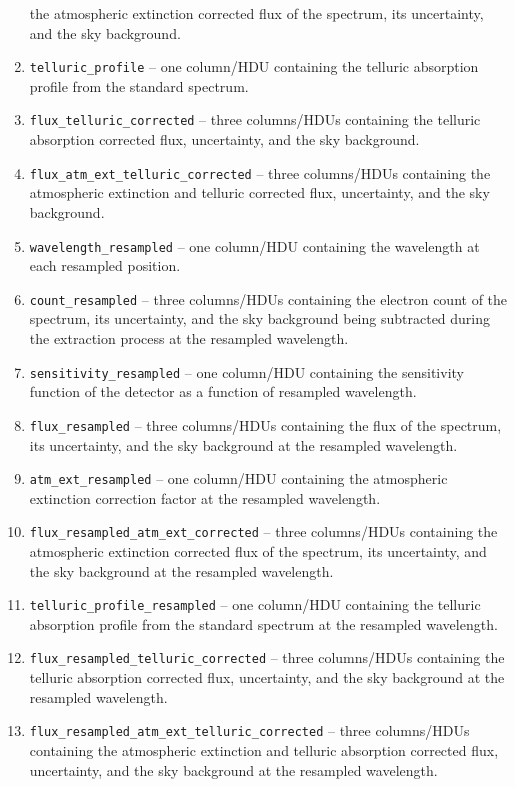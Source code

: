 \documentclass[linenumbers, twocolumn]{aastex631}
\begin{document}
\begin{enumerate}
    the atmospheric extinction corrected flux of the spectrum, its
    uncertainty, and the sky background.
    \item \texttt{telluric\_profile} -- one column/HDU containing the telluric
    absorption profile from the standard spectrum.
    \item \texttt{flux\_telluric\_corrected} -- three columns/HDUs containing
    the telluric absorption corrected flux, uncertainty, and the sky
    background.
    \item \texttt{flux\_atm\_ext\_telluric\_corrected} -- three columns/HDUs
    containing the atmospheric extinction and telluric corrected flux,
    uncertainty, and the sky background.
    \item \texttt{wavelength\_resampled} -- one column/HDU containing the
    wavelength at each resampled position.
    \item \texttt{count\_resampled} -- three columns/HDUs containing the
    electron count of the spectrum, its uncertainty, and the sky background
    being subtracted during the extraction process at the resampled wavelength.
    \item \texttt{sensitivity\_resampled} -- one column/HDU containing the
    sensitivity function of the detector as a function of resampled wavelength.
    \item \texttt{flux\_resampled} -- three columns/HDUs containing the
    flux of the spectrum, its uncertainty, and the sky background at the
    resampled wavelength.
    \item \texttt{atm\_ext\_resampled} -- one column/HDU containing the
    atmospheric extinction correction factor at the resampled wavelength.
    \item \texttt{flux\_resampled\_atm\_ext\_corrected} -- three columns/HDUs
    containing the atmospheric extinction corrected flux of the spectrum, its
    uncertainty, and the sky background at the resampled wavelength.
    \item \texttt{telluric\_profile\_resampled} -- one column/HDU containing
    the telluric absorption profile from the standard spectrum at the resampled
    wavelength.
    \item \texttt{flux\_resampled\_telluric\_corrected} -- three columns/HDUs
    containing the telluric absorption corrected flux, uncertainty, and the sky
    background at the resampled wavelength.
    \item \texttt{flux\_resampled\_atm\_ext\_telluric\_corrected} -- three
    columns/HDUs containing the atmospheric extinction and telluric absorption
    corrected flux, uncertainty, and the sky background at the resampled
    wavelength.
\end{enumerate}
\end{document}
